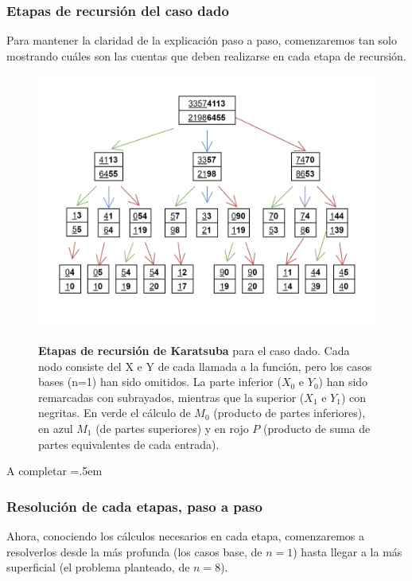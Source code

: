 \documentclass[titlepage,a4paper]{article}
\newenvironment{lcverbatim}
 {\SaveVerbatim{cverb}}
 {\endSaveVerbatim
  \flushleft\fboxrule=0pt\fboxsep=.5em
  \colorbox{cverbbg}{%
    \makebox[\dimexpr\linewidth-2\fboxsep][l]{\BUseVerbatim{cverb}}%
  }
  \endflushleft
}
\begin{document}
\subsubsection{Etapas de recursión del caso dado}
Para mantener la claridad de la explicación paso a paso, comenzaremos tan solo mostrando cuáles son las cuentas que deben realizarse en cada etapa de recursión.

\begin{figure}[H]
\centering
\includegraphics[width=\textwidth]{Karatsuba106713.drawio.png}
\caption{\label{fig:etapas}}\textbf{Etapas de recursión de Karatsuba} para el caso dado. Cada nodo consiste del X e Y de cada llamada a la función, pero los casos bases (n=1) han sido omitidos. La parte inferior ($X_0$ e $Y_0$) han sido remarcadas con subrayados, mientras que la superior ($X_1$ e $Y_1$) con negritas. En verde el cálculo de $M_0$ (producto de partes inferiores), en azul $M_1$ (de partes superiores) y en rojo $P$ (producto de suma de partes equivalentes de cada entrada).
\end{figure}

\begin{lcverbatim}
    A completar
\end{lcverbatim}

\subsubsection{Resolución de cada etapas, paso a paso}

Ahora, conociendo los cálculos necesarios en cada etapa, comenzaremos a resolverlos desde la más profunda (los casos base, de $n=1$) hasta llegar a la más superficial (el problema planteado, de $n=8$).
\end{document}

